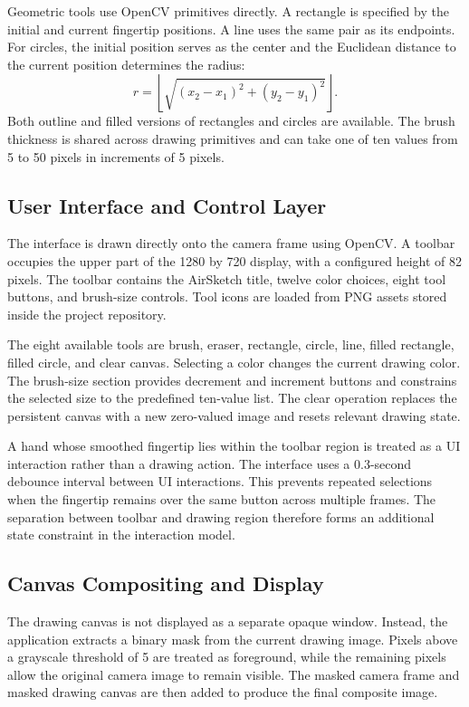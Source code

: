 \documentclass[conference]{IEEEtran}
\begin{document}
Geometric tools use OpenCV primitives directly. A rectangle is specified by the initial and current fingertip positions. A line uses the same pair as its endpoints. For circles, the initial position serves as the center and the Euclidean distance to the current position determines the radius:
\begin{equation}
 r = \left\lfloor\sqrt{(x_2-x_1)^2+(y_2-y_1)^2}\right\rfloor.
\end{equation}
Both outline and filled versions of rectangles and circles are available. The brush thickness is shared across drawing primitives and can take one of ten values from 5 to 50 pixels in increments of 5 pixels.

\subsection{User Interface and Control Layer}
The interface is drawn directly onto the camera frame using OpenCV. A toolbar occupies the upper part of the 1280 by 720 display, with a configured height of 82 pixels. The toolbar contains the AirSketch title, twelve color choices, eight tool buttons, and brush-size controls. Tool icons are loaded from PNG assets stored inside the project repository.

The eight available tools are brush, eraser, rectangle, circle, line, filled rectangle, filled circle, and clear canvas. Selecting a color changes the current drawing color. The brush-size section provides decrement and increment buttons and constrains the selected size to the predefined ten-value list. The clear operation replaces the persistent canvas with a new zero-valued image and resets relevant drawing state.

A hand whose smoothed fingertip lies within the toolbar region is treated as a UI interaction rather than a drawing action. The interface uses a 0.3-second debounce interval between UI interactions. This prevents repeated selections when the fingertip remains over the same button across multiple frames. The separation between toolbar and drawing region therefore forms an additional state constraint in the interaction model.

\subsection{Canvas Compositing and Display}
The drawing canvas is not displayed as a separate opaque window. Instead, the application extracts a binary mask from the current drawing image. Pixels above a grayscale threshold of 5 are treated as foreground, while the remaining pixels allow the original camera image to remain visible. The masked camera frame and masked drawing canvas are then added to produce the final composite image.
\end{document}

